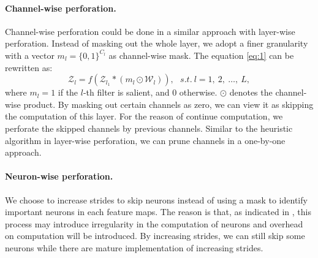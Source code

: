 \documentclass[pageno]{jpaper}
\begin{document}
\paragraph{Channel-wise perforation.} Channel-wise perforation could be done in a similar approach with layer-wise perforation. Instead of masking out the whole layer, we adopt a finer granularity with a vector $m_l = \{0,1\}^{C_l}$ as channel-wise mask. The equation \ref{eq:1} can be rewritten as:
\begin{equation} \label{eq: 3}
    \mathcal{Z}_l = f(\mathcal{Z}_{l_1} \ast (m_l \odot \mathcal{W}_l) ), \ \ \  s.t. \: l = 1,\: 2, \: \dots, \: L,
\end{equation}
where $m_l = 1$ if the $l$-th filter is salient, and $0$ otherwise. $\odot$ denotes the channel-wise product. By masking out certain channels as zero, we can view it as skipping the computation of this layer. For the reason of continue computation, we perforate the skipped channels by previous channels. Similar to the heuristic algorithm in layer-wise perforation, we can prune channels in a one-by-one approach.

\paragraph{Neuron-wise perforation.} We choose to increase strides to skip neurons instead of using a mask to identify important neurons in each feature maps. The reason is that, as indicated in \cite{aklaghi2018snapea, buckler2018eva, hegde2018ucnn}, this process may introduce irregularity in the computation of neurons and overhead on computation will be introduced. By increasing strides, we can still skip some neurons while there are mature implementation of increasing strides.

\end{document}

